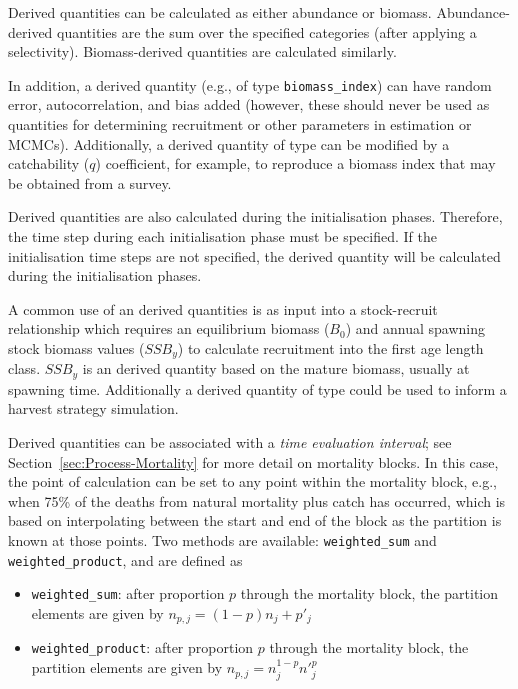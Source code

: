 Derived quantities can be calculated as either abundance or biomass. Abundance-derived quantities are the sum over the specified categories (after applying a selectivity)\label{sec:DerivedQuantity-Abundance}. Biomass-derived quantities are calculated similarly\label{sec:DerivedQuantity-Biomass}. 

In addition, a derived quantity (e.g., of type \texttt{biomass\_index}) can have random error, autocorrelation, and bias added (however, these should never be used as quantities for determining recruitment or other parameters in estimation or MCMCs).\label{sec:DerivedQuantity-BiomassIndex} Additionally, a derived quantity of type  can be modified by a catchability ($q$) coefficient, for example, to reproduce a biomass index that may be obtained from a survey.

Derived quantities are also calculated during the initialisation phases. Therefore, the time step during each initialisation phase must be specified. If the initialisation time steps are not specified, the derived quantity will be calculated during the initialisation phases. 

A common use of an derived quantities is as input into a stock-recruit relationship  which requires an equilibrium biomass ($B_0$) and annual spawning stock biomass values ($SSB_y$) to calculate recruitment into the first \ifAgeBased age \else length \fi class. $SSB_y$ is an derived quantity based on the mature biomass, usually at spawning time. Additionally a derived quantity of type  could be used to inform a harvest strategy simulation.

Derived quantities can be associated with a \textit{time evaluation interval}; see Section~\ref{sec:Process-Mortality} for more detail on mortality blocks. In this case, the point of calculation can be set to any point within the mortality block, e.g., when 75\% of the deaths from natural mortality plus catch has occurred, which is based on interpolating between the start and end of the block as the partition is known at those points. Two methods are available: \texttt{weighted\_sum} and \texttt{weighted\_product}, and are defined as

\begin{itemize}
	\item \texttt{weighted\_sum}: after proportion $p$ through the mortality block, the partition elements are given by $n_{p,j} = (1 - p)n_j + p'_j$

	\item \texttt{weighted\_product}: after proportion $p$ through the mortality block, the partition elements are given by $n_{p,j} = n_j^{1-p} n'^p_j$
\end{itemize}

